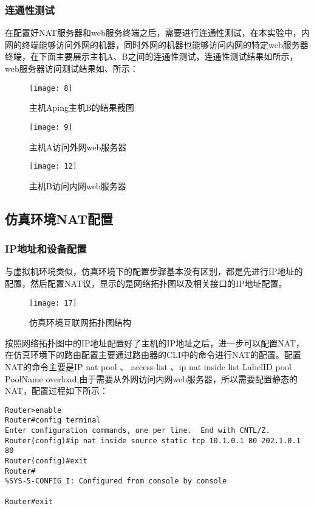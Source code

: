 \documentclass[lang=cn,11pt]{elegantpaper}
\begin{document}
\subsubsection{连通性测试}
在配置好NAT服务器和web服务终端之后，需要进行连通性测试，在本实验中，内网的终端能够访问外网的机器，同时外网的机器也能够访问内网的特定web服务器终端，在下面主要展示主机A、B之间的连通性测试，连通性测试结果如所示，web服务器访问测试结果如、所示：
\begin{figure}[htbp]
	\centering
	\texttt{[image: 8]}
	\caption{主机Aping主机B的结果截图\label{fig:8}}
\end{figure}

\begin{figure}[htbp]
	\begin{minipage}[t]{0.5\textwidth}
		\centering
		\texttt{[image: 9]}
		\caption{主机A访问外网web服务器\label{fig:A}}
	\end{minipage}
	\begin{minipage}[t]{0.5\textwidth}
		\centering
		\texttt{[image: 12]}
		\caption{主机B访问内网web服务器 \label{fig:B}}
	\end{minipage}
\end{figure}

\subsection{仿真环境NAT配置}
\subsubsection{IP地址和设备配置}
与虚拟机环境类似，仿真环境下的配置步骤基本没有区别，都是先进行IP地址的配置，然后配置NAT议，显示的是网络拓扑图以及相关接口的IP地址配置。
\begin{figure}[htbp]
	\centering
	\texttt{[image: 17]}
	\caption{仿真环境互联网拓扑图结构 \label{fig:11}}
\end{figure}

按照网络拓扑图中的IP地址配置好了主机的IP地址之后，进一步可以配置NAT，在仿真环境下的路由配置主要通过路由器的CLI中的命令进行NAT的配置。配置NAT的命令主要是IP nat pool 、 access-list 、ip nat inside  list  LabelID pool PoolName overload,由于需要从外网访问内网web服务器，所以需要配置静态的NAT，配置过程如下所示：

\begin{lstlisting}
Router>enable 
Router#config terminal
Enter configuration commands, one per line.  End with CNTL/Z.
Router(config)#ip nat inside source static tcp 10.1.0.1 80 202.1.0.1 80
Router(config)#exit
Router#
%SYS-5-CONFIG_I: Configured from console by console

Router#exit
\end{lstlisting}
\end{document}
